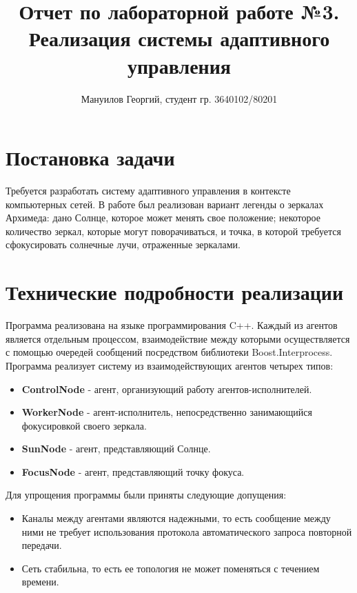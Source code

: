 \documentclass{report}
\title{
Отчет по лабораторной работе №3.\\
Реализация системы адаптивного управления
}
\author{Мануилов Георгий, студент гр. 3640102/80201}
\date{}
\begin{document}
\maketitle

\renewcommand\thesection{\arabic{section}}

\section{Постановка задачи}
Требуется разработать систему адаптивного управления в контексте компьютерных сетей. В работе был реализован вариант легенды о зеркалах Архимеда: дано Солнце, которое может менять свое положение; некоторое количество зеркал, которые могут поворачиваться, и точка, в которой требуется сфокусировать солнечные лучи, отраженные зеркалами. 

\section{Технические подробности реализации}
Программа реализована на языке программирования C++. Каждый из агентов является отдельным процессом, взаимодействие между которыми осуществляется с помощью очередей сообщений посредством библиотеки Boost.Interprocess.
\newline
\newline
Программа реализует систему из взаимодействующих агентов четырех типов:
\begin{itemize}
    \item {\bf ControlNode} - агент, организующий работу агентов-исполнителей.
    \item {\bf WorkerNode} - агент-исполнитель, непосредственно занимающийся фокусировкой своего зеркала.
    \item {\bf SunNode} - агент, представляющий Солнце.
    \item {\bf FocusNode} - агент, представляющий точку фокуса.
\end{itemize}
\newline
Для упрощения программы были приняты следующие допущения:
\begin{itemize}
    \item Каналы между агентами являются надежными, то есть сообщение между ними не требует использования протокола автоматического запроса повторной передачи.
    \item Сеть стабильна, то есть ее топология не может поменяться с течением времени.
\end{itemize}
\end{document}
